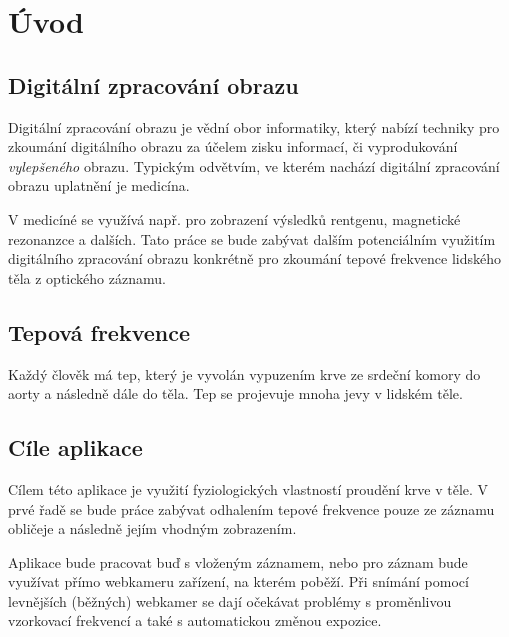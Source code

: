 \documentclass[
  digital, %
  table,   %
%
  lof,     %
  lot,     %
]{fithesis3}
\begin{document}
\chapter{Úvod}
\section{Digitální zpracování obrazu}
Digitální zpracování obrazu je vědní obor informatiky, který nabízí techniky pro zkoumání digitálního obrazu za účelem zisku informací, či vyprodukování \emph{vylepšeného} obrazu. Typickým odvětvím, ve kterém nachází digitální zpracování obrazu uplatnění je medicína.

V medicíné se využívá např. pro zobrazení výsledků rentgenu, magnetické rezonanzce a dalších. Tato práce se bude zabývat dalším potenciálním využitím digitálního zpracování obrazu konkrétně pro zkoumání tepové frekvence lidského těla z optického záznamu.

\section{Tepová frekvence}
Každý člověk má tep, který je vyvolán vypuzením krve ze srdeční komory do aorty a následně dále do těla. Tep se projevuje mnoha jevy v lidském těle.


\section{Cíle aplikace}
Cílem této aplikace je využití fyziologických vlastností proudění krve v těle. V prvé řadě se bude práce zabývat odhalením tepové frekvence pouze ze záznamu obličeje a následně jejím vhodným zobrazením.

Aplikace bude pracovat buď s vloženým záznamem, nebo pro záznam bude využívat přímo webkameru zařízení, na kterém poběží. Při snímání pomocí levnějších (běžných) webkamer se dají očekávat problémy s proměnlivou vzorkovací frekvencí a také s automatickou změnou expozice.
\end{document}
